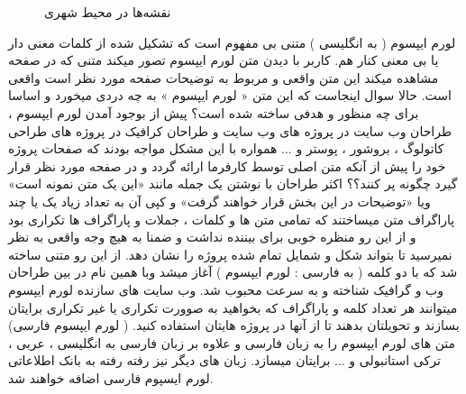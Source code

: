 \begin{figure}[p]
\centering     %
{}\hspace{-2mm}
\hspace{-2mm}
\hspace{-2mm}
\caption[نمونه نقشه‌ها]
{نقشه‌ها در محیط شهری}
\end{figure}
لورم ایپسوم ( به انگلیسی  ) متنی بی مفهوم است که تشکیل شده از کلمات معنی دار یا بی معنی کنار هم. کاربر با دیدن متن لورم ایپسوم تصور میکند متنی که در صفحه مشاهده میکند این متن واقعی و مربوط به توضیحات صفحه مورد نظر است واقعی است. حالا سوال اینجاست که این متن « لورم ایپسوم » به چه دردی میخورد و اساسا برای چه منظور و هدفی ساخته شده است؟ پیش از بوجود آمدن لورم ایپسوم ، طراحان وب سایت در پروژه های وب سایت و طراحان کرافیک در پروژه های طراحی کاتولوگ ، بروشور ، پوستر و ... همواره با این مشکل مواجه بودند که صفحات پروژه خود را پیش از آنکه متن اصلی توسط کارفرما ارائه گردد و در صفحه مورد نظر قرار گیرد چگونه پر کنند؟؟ اکثر طراحان با نوشتن یک جمله مانند «این یک متن نمونه است» ویا «توضیحات در این بخش قرار خواهند گرفت» و کپی آن به تعداد زیاد یک یا چند پاراگراف متن میساختند که تمامی متن ها و کلمات ، جملات و پاراگراف ها تکراری بود و از این رو منظره خوبی برای بیننده نداشت و ضمنا به هیچ وجه واقعی به نظر نمیرسید تا بتواند شکل و شمایل تمام شده پروژه را نشان دهد. از این رو متنی ساخته شد که با دو کلمه ( به فارسی : لورم ایپسوم ) آغاز میشد وبا همین نام در بین طراحان وب و گرافیک شناخته و به سرعت محبوب شد. وب سایت های سازنده لورم ایپسوم میتوانند هر تعداد کلمه و پاراگراف که بخواهید به صوورت تکراری یا غیر تکراری برایتان بسازند و تحویلتان بدهند تا از آنها در پروژه هایتان استفاده کنید. ( لورم ایپسوم فارسی) متن های لورم ایپسوم را به زبان فارسی و علاوه بر زبان فارسی به انگلیسی ، عربی ، ترکی استانبولی و ... برایتان میسازد. زبان های دیگر نیز رفته رفته به بانک اطلاعاتی لورم ایسپوم فارسی اضافه خواهند شد.  


